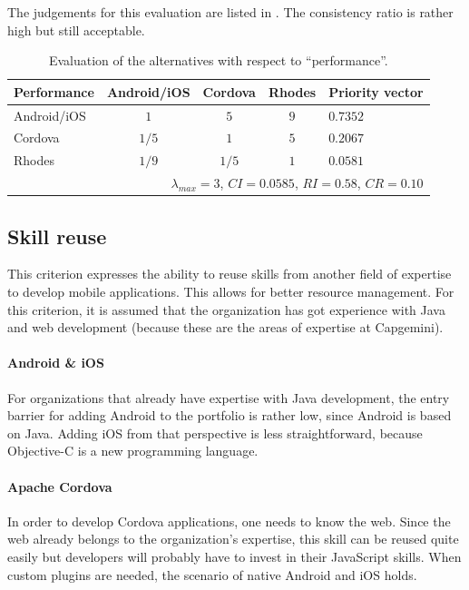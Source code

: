 The judgements for this evaluation are listed in . The consistency ratio is rather high but still acceptable.

\begin{table}[h!]
    \centering
    \begin{tabular}{lcccl}
        \hline
        \textbf{Performance} & Android/iOS & Cordova & Rhodes & Priority vector \\
        \hline
        Android/iOS          & $1$         & $5$     & $9$    & $0.7352$        \\
        Cordova              & $1/5$       & $1$     & $5$    & $0.2067$        \\
        Rhodes               & $1/9$       & $1/5$   & $1$    & $0.0581$        \\
        \hline
        \multicolumn{5}{r}{$\lambda_{max} = 3$, $CI = 0.0585$, $RI = 0.58$, $CR = 0.10$}\\
        \hline
    \end{tabular}
    \caption{Evaluation of the alternatives with respect to ``performance''.}
    \label{tab:performance}
\end{table}

\subsection{Skill reuse}

This criterion expresses the ability to reuse skills from another field of expertise to develop mobile applications. This allows for better resource management. For this criterion, it is assumed that the organization has got experience with Java and web development (because these are the areas of expertise at Capgemini). 

\paragraph{Android \& iOS} For organizations that already have expertise with Java development, the entry barrier for adding Android to the portfolio is rather low, since Android is based on Java. Adding iOS from that perspective is less straightforward, because Objective-C is a new programming language.

\paragraph{Apache Cordova} In order to develop Cordova applications, one needs to know the web. Since the web already belongs to the organization's expertise, this skill can be reused quite easily but developers will probably have to invest in their JavaScript skills. When custom plugins are needed, the scenario of native Android and iOS holds.

